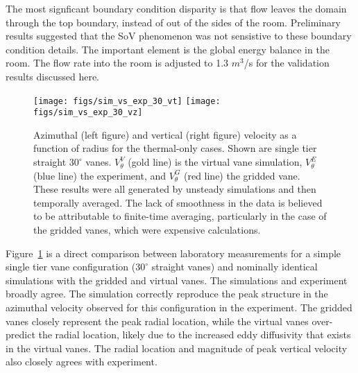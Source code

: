 The most signficant boundary condition disparity is that flow leaves the
domain through the top boundary, instead of out of the sides of the
room. Preliminary results suggested that the SoV phenomenon  was not
sensistive to these boundary condition details. The important element is
the  global energy balance in the room. The flow rate into the room is
adjusted to  1.3 $m^3$/s for the validation results discussed here.  


\begin{figure}[htp!]

  \centering
  \texttt{[image: figs/sim\_vs\_exp\_30\_vt]}
 \hfill
 \texttt{[image: figs/sim\_vs\_exp\_30\_vz]}%
 \caption{Azimuthal (left figure) and vertical (right figure) velocity 
 as a function of radius for the thermal-only cases. Shown are single
 tier straight $30^{\circ}$ vanes. $V_{\theta}^V$ (gold line) is
 the virtual vane simulation, $V_{\theta}^E$ (blue line) the experiment,
 and $V_{\theta}^G$ (red line) the gridded vane. These results were all
 generated by unsteady simulations and then temporally averaged. 
 The lack of smoothness in the data is believed to be
 attributable to finite-time averaging, particularly in the case of the
 gridded vanes, which were expensive calculations. }   
 \label{fig:val_lab}  
\end{figure}

Figure~\ref{fig:val_lab} is a direct comparison
between laboratory  
measurements for a simple single tier vane configuration ($30^{\circ}$
straight vanes) and nominally identical simulations with the gridded and
virtual vanes. The simulations and experiment broadly agree. The
simulation correctly reproduce the peak structure in the azimuthal
velocity observed for this configuration in the experiment. The gridded
vanes closely represent the peak radial location, while the
virtual vanes over-predict the radial location, likely due to the
increased eddy diffusivity that exists in the virtual vanes. The radial
location and magnitude of peak vertical velocity also closely agrees
with experiment. 

